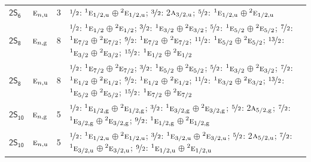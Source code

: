 \documentclass[10pt,a4paper]{article}
\numberwithin{equation}{section}
\newcommand{\grp}[1]{\mathsf{#1}}
\newcommand{\irr}[1]{\text{\normalfont\scshape #1}}
\newcommand{\conjpair}[1]{{}^{#1}}
\newcommand{\ptag}[1]{\mathrm{#1}}
\newlength{\fillwidth}\newlength{\cellwidth}\newlength{\colwidth}
\begin{document}
{\begin{longtable}{@{}llr>{\RaggedRight\arraybackslash}p{\fillwidth}@{}}
\href{2S6.pdf}{$\grp{2S_{6}}$} & $\irr{e}_{n,\ptag{u}}$ & 3 & $\nicefrac{1}{2}$: $\conjpair{1}\irr{e}_{1/2,\ptag{u}}$${}\oplus{}$$\conjpair{2}\irr{e}_{1/2,\ptag{u}}$; $\nicefrac{3}{2}$: 2$\irr{a}_{3/2,\ptag{u}}$; $\nicefrac{5}{2}$: $\conjpair{1}\irr{e}_{1/2,\ptag{u}}$${}\oplus{}$$\conjpair{2}\irr{e}_{1/2,\ptag{u}}$\\
\href{2S8.pdf}{$\grp{2S_{8}}$} & $\irr{e}_{n,\ptag{g}}$ & 8 & $\nicefrac{1}{2}$: $\conjpair{1}\irr{e}_{1/2}$${}\oplus{}$$\conjpair{2}\irr{e}_{1/2}$; $\nicefrac{3}{2}$: $\conjpair{1}\irr{e}_{3/2}$${}\oplus{}$$\conjpair{2}\irr{e}_{3/2}$; $\nicefrac{5}{2}$: $\conjpair{1}\irr{e}_{5/2}$${}\oplus{}$$\conjpair{2}\irr{e}_{5/2}$; $\nicefrac{7}{2}$: $\conjpair{1}\irr{e}_{7/2}$${}\oplus{}$$\conjpair{2}\irr{e}_{7/2}$; $\nicefrac{9}{2}$: $\conjpair{1}\irr{e}_{7/2}$${}\oplus{}$$\conjpair{2}\irr{e}_{7/2}$; $\nicefrac{11}{2}$: $\conjpair{1}\irr{e}_{5/2}$${}\oplus{}$$\conjpair{2}\irr{e}_{5/2}$; $\nicefrac{13}{2}$: $\conjpair{1}\irr{e}_{3/2}$${}\oplus{}$$\conjpair{2}\irr{e}_{3/2}$; $\nicefrac{15}{2}$: $\conjpair{1}\irr{e}_{1/2}$${}\oplus{}$$\conjpair{2}\irr{e}_{1/2}$\\
\href{2S8.pdf}{$\grp{2S_{8}}$} & $\irr{e}_{n,\ptag{u}}$ & 8 & $\nicefrac{1}{2}$: $\conjpair{1}\irr{e}_{7/2}$${}\oplus{}$$\conjpair{2}\irr{e}_{7/2}$; $\nicefrac{3}{2}$: $\conjpair{1}\irr{e}_{5/2}$${}\oplus{}$$\conjpair{2}\irr{e}_{5/2}$; $\nicefrac{5}{2}$: $\conjpair{1}\irr{e}_{3/2}$${}\oplus{}$$\conjpair{2}\irr{e}_{3/2}$; $\nicefrac{7}{2}$: $\conjpair{1}\irr{e}_{1/2}$${}\oplus{}$$\conjpair{2}\irr{e}_{1/2}$; $\nicefrac{9}{2}$: $\conjpair{1}\irr{e}_{1/2}$${}\oplus{}$$\conjpair{2}\irr{e}_{1/2}$; $\nicefrac{11}{2}$: $\conjpair{1}\irr{e}_{3/2}$${}\oplus{}$$\conjpair{2}\irr{e}_{3/2}$; $\nicefrac{13}{2}$: $\conjpair{1}\irr{e}_{5/2}$${}\oplus{}$$\conjpair{2}\irr{e}_{5/2}$; $\nicefrac{15}{2}$: $\conjpair{1}\irr{e}_{7/2}$${}\oplus{}$$\conjpair{2}\irr{e}_{7/2}$\\
\href{2S10.pdf}{$\grp{2S_{10}}$} & $\irr{e}_{n,\ptag{g}}$ & 5 & $\nicefrac{1}{2}$: $\conjpair{1}\irr{e}_{1/2,\ptag{g}}$${}\oplus{}$$\conjpair{2}\irr{e}_{1/2,\ptag{g}}$; $\nicefrac{3}{2}$: $\conjpair{1}\irr{e}_{3/2,\ptag{g}}$${}\oplus{}$$\conjpair{2}\irr{e}_{3/2,\ptag{g}}$; $\nicefrac{5}{2}$: 2$\irr{a}_{5/2,\ptag{g}}$; $\nicefrac{7}{2}$: $\conjpair{1}\irr{e}_{3/2,\ptag{g}}$${}\oplus{}$$\conjpair{2}\irr{e}_{3/2,\ptag{g}}$; $\nicefrac{9}{2}$: $\conjpair{1}\irr{e}_{1/2,\ptag{g}}$${}\oplus{}$$\conjpair{2}\irr{e}_{1/2,\ptag{g}}$\\
\href{2S10.pdf}{$\grp{2S_{10}}$} & $\irr{e}_{n,\ptag{u}}$ & 5 & $\nicefrac{1}{2}$: $\conjpair{1}\irr{e}_{1/2,\ptag{u}}$${}\oplus{}$$\conjpair{2}\irr{e}_{1/2,\ptag{u}}$; $\nicefrac{3}{2}$: $\conjpair{1}\irr{e}_{3/2,\ptag{u}}$${}\oplus{}$$\conjpair{2}\irr{e}_{3/2,\ptag{u}}$; $\nicefrac{5}{2}$: 2$\irr{a}_{5/2,\ptag{u}}$; $\nicefrac{7}{2}$: $\conjpair{1}\irr{e}_{3/2,\ptag{u}}$${}\oplus{}$$\conjpair{2}\irr{e}_{3/2,\ptag{u}}$; $\nicefrac{9}{2}$: $\conjpair{1}\irr{e}_{1/2,\ptag{u}}$${}\oplus{}$$\conjpair{2}\irr{e}_{1/2,\ptag{u}}$\\

\end{longtable}}
\end{document}
